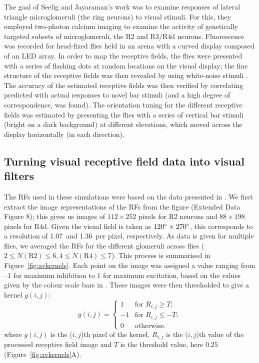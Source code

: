 \documentclass[10pt]{article}
\begin{document}
The goal of Seelig and Jayaraman's \cite{Seelig2013} work was to examine responses of lateral triangle microglomeruli (the ring neurons) to visual stimuli.
For this, they employed two-photon calcium imaging to examine the activity of genetically targeted subsets of microglomeruli, the R2 and R3/R4d neurons.
Fluorescence was recorded for head-fixed flies held in an arena with a curved display composed of an LED array.
In order to map the receptive fields, the flies were presented with a series of flashing dots at random locations on the visual display; the fine structure of the receptive fields was then revealed by using white-noise stimuli \cite{Weber2010}.
The accuracy of the estimated receptive fields was then verified by correlating predicted with actual responses to novel bar stimuli (and a high degree of correspondence, was found).
The orientation tuning for the different receptive fields was estimated by presenting the flies with a series of vertical bar stimuli (bright on a dark background) at different elevations, which moved across the display horizontally (in each direction).

\subsection*{Turning visual receptive field data into visual filters}
\label{sec:methods:preprocessing}
The RFs used in these simulations were based on the data presented in \cite{Seelig2013}.
We first extract the image representations of the RFs from the figure (Extended Data Figure 8); this gives us images of $112\times 252$ pixels for R2 neurons and $88\times 198$ pixels for R4d.
Given the visual field is taken as $120\degree\times 270\degree$, this corresponds to a resolution of 1.07\degree\ and 1.36\degree\ per pixel, respectively.
As data is given for multiple flies, we averaged the RFs for the different glomeruli across flies ($2\le N(\mathrm{R2}) \le 6, 4\le N(\mathrm{R4})\le 7$). This process is summarised in Figure~\ref{fig:avkernels}. Each point on the image was assigned a value ranging from --1 for maximum inhibition to 1 for maximum excitation, based on the values given by the colour scale bars in \cite{Seelig2013}.
These images were then thresholded to give a kernel $g(i,j)$:
$$
g(i,j) = \left\{ \begin{array}{rl}
1 & \mbox{for } R_{i,j} \ge T; \\
-1 & \mbox{for } R_{i,j} \le -T; \\
0 & \mbox{otherwise.}
\end{array}
\right.
$$
where $g(i,j)$ is the ($i,j$)th pixel of the kernel, $R_{i,j}$ is the ($i,j$)th value of the processed receptive field image and $T$ is the threshold value, here $0.25$ (Figure~\ref{fig:avkernels}A).
\end{document}
